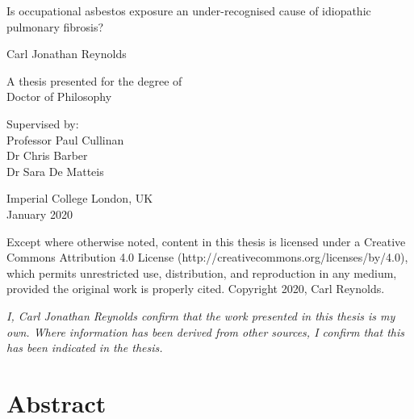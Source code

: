 \documentclass[
]{article}
\date{}
\begin{document}
\begin{titlepage}
    \begin{center}
        
        \vspace*{2.5cm}
        
        \huge
        Is occupational asbestos exposure an under-recognised cause of idiopathic pulmonary fibrosis?
        \vspace{1.5cm}
        
        \Large
        Carl Jonathan Reynolds
        
        \vspace{1.5cm}

        \normalsize
        A thesis presented for the degree of\\
        Doctor of Philosophy
        
        \vfill
        
        \normalsize
        Supervised by:\\
        Professor Paul Cullinan\\
        Dr Chris Barber \\
        Dr Sara De Matteis

        \vspace{0.8cm}

        \normalsize
        Imperial College London, UK\\
        January 2020

         Except where otherwise noted, content in this thesis is licensed under a Creative Commons Attribution 4.0 License (http://creativecommons.org/licenses/by/4.0), which permits unrestricted use, distribution, and reproduction in any medium, provided the original work is properly cited. Copyright 2020, Carl Reynolds.

    \end{center}
\end{titlepage}

\vspace*{\fill}

\noindent \textit{
I, Carl Jonathan Reynolds confirm that the work presented in this thesis is my own. Where information has been derived from other sources, I confirm that this has been indicated in the thesis.
} \vspace*{\fill}

\setcounter{page}{2}

\hypertarget{abstract}{%
\section*{Abstract}\label{abstract}}
\end{document}
